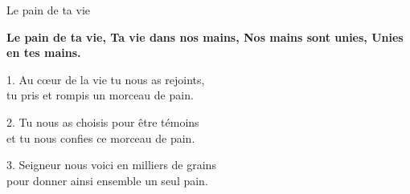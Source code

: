 Le pain de ta vie

\textbf{Le pain de ta vie, Ta vie dans nos mains, Nos mains sont unies, Unies en tes mains.}

1. Au cœur de la vie tu nous as rejoints,\\
tu pris et rompis un morceau de pain.

2. Tu nous as choisis pour être témoins\\
et tu nous confies ce morceau de pain.

3. Seigneur nous voici en milliers de grains\\
pour donner ainsi ensemble un seul pain.

